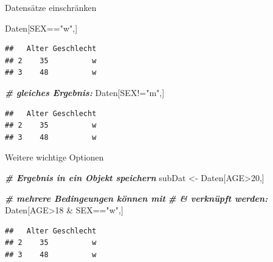 \documentclass[
  ignorenonframetext,
]{beamer}
\newenvironment{Shaded}{\begin{snugshade}}{\end{snugshade}}
\newcommand{\CommentTok}[1]{\textcolor[rgb]{0.00,0.40,1.00}{\textbf{\textit{#1}}}}
\newcommand{\DecValTok}[1]{\textcolor[rgb]{0.27,0.67,0.26}{#1}}
\newcommand{\NormalTok}[1]{\textcolor[rgb]{0.74,0.68,0.62}{#1}}
\newcommand{\OperatorTok}[1]{\textcolor[rgb]{0.74,0.68,0.62}{#1}}
\newcommand{\StringTok}[1]{\textcolor[rgb]{0.02,0.61,0.04}{#1}}
\begin{document}
\begin{frame}[fragile]{Datensätze einschränken}
\protect\hypertarget{datensatze-einschranken}{}

\begin{Shaded}
\begin{Highlighting}[]
\NormalTok{Daten[SEX}\OperatorTok{==}\StringTok{"w"}\NormalTok{,]}
\end{Highlighting}
\end{Shaded}

\begin{verbatim}
##   Alter Geschlecht
## 2    35          w
## 3    48          w
\end{verbatim}

\begin{Shaded}
\begin{Highlighting}[]
\CommentTok{# gleiches Ergebnis:}
\NormalTok{Daten[SEX}\OperatorTok{!=}\StringTok{"m"}\NormalTok{,]}
\end{Highlighting}
\end{Shaded}

\begin{verbatim}
##   Alter Geschlecht
## 2    35          w
## 3    48          w
\end{verbatim}

\end{frame}

\begin{frame}[fragile]{Weitere wichtige Optionen}
\protect\hypertarget{weitere-wichtige-optionen}{}

\begin{Shaded}
\begin{Highlighting}[]
\CommentTok{# Ergebnis in ein Objekt speichern}
\NormalTok{subDat <-}\StringTok{ }\NormalTok{Daten[AGE}\OperatorTok{>}\DecValTok{20}\NormalTok{,]}
\end{Highlighting}
\end{Shaded}

\begin{Shaded}
\begin{Highlighting}[]
\CommentTok{# mehrere Bedingeungen können mit}
\CommentTok{# & verknüpft werden:}
\NormalTok{Daten[AGE}\OperatorTok{>}\DecValTok{18} \OperatorTok{&}\StringTok{ }\NormalTok{SEX}\OperatorTok{==}\StringTok{"w"}\NormalTok{,]}
\end{Highlighting}
\end{Shaded}

\begin{verbatim}
##   Alter Geschlecht
## 2    35          w
## 3    48          w
\end{verbatim}

\end{frame}
\end{document}
